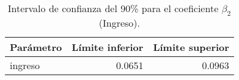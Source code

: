 \begin{table}
\caption{Intervalo de confianza del 90\% para el coeficiente $\beta_2$ (Ingreso).}
\label{tab:ci_beta2}
\begin{tabular}{lrr}
\toprule
Parámetro & Límite inferior & Límite superior \\
\midrule
ingreso & 0.0651 & 0.0963 \\
\bottomrule
\end{tabular}
\end{table}
